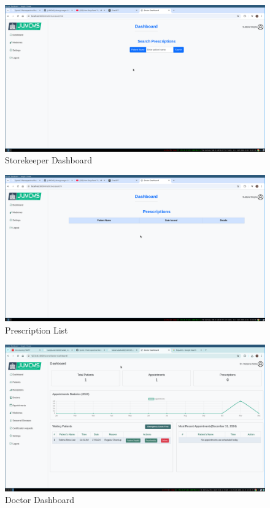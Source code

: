 \documentclass[a4paper,12pt]{article}
\begin{document}
\begin{figure}[H]
    \centering
    \includegraphics[width=1\textwidth]{images/spr1output3.png}
    \caption{Storekeeper Dashboard}
    \label{fig:storekeeperdashboard}
\end{figure}

\begin{figure}[H]
    \centering
    \includegraphics[width=1\textwidth]{images/spr1output4.png}
    \caption{Prescription List}
    \label{fig:prescriptionlist}
\end{figure}
\begin{figure}[H]
    \centering
    \includegraphics[width=1\textwidth]{images/sprintoutput01.png}
    \caption{Doctor Dashboard}
    \label{fig:doctordashboard}
\end{figure}
\end{document}
